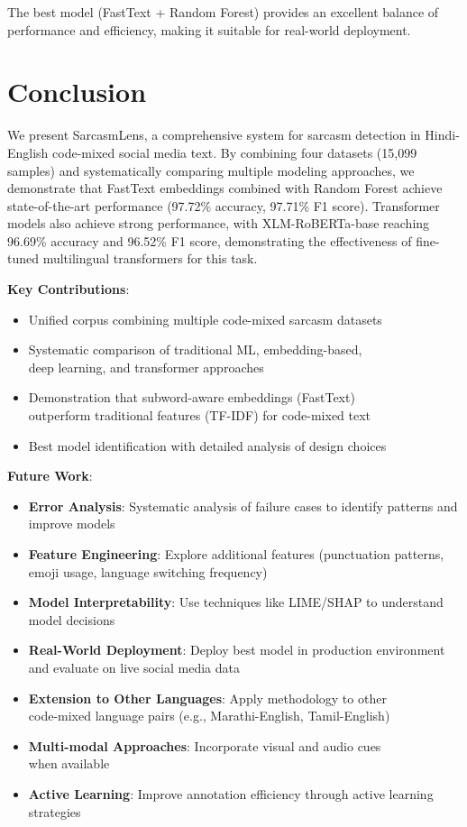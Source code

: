\documentclass[11pt]{article}
\begin{document}
The best model (FastText + Random Forest) provides an excellent balance of performance and efficiency, making it suitable for real-world deployment.

\section{Conclusion}

We present SarcasmLens, a comprehensive system for sarcasm detection in Hindi-English code-mixed social media text. By combining four datasets (15,099 samples) and systematically comparing multiple modeling approaches, we demonstrate that FastText embeddings combined with Random Forest achieve state-of-the-art performance (97.72\% accuracy, 97.71\% F1 score). Transformer models also achieve strong performance, with XLM-RoBERTa-base reaching 96.69\% accuracy and 96.52\% F1 score, demonstrating the effectiveness of fine-tuned multilingual transformers for this task.

\textbf{Key Contributions}:
\begin{itemize}
\item Unified corpus combining multiple code-mixed sarcasm datasets
\item Systematic comparison of traditional ML, embedding-based,\\ deep learning, and transformer approaches
\item Demonstration that subword-aware embeddings (FastText)\\ outperform traditional features (TF-IDF) for code-mixed text
\item Best model identification with detailed analysis of design choices
\end{itemize}

\textbf{Future Work}:
\begin{itemize}
\item \textbf{Error Analysis}: Systematic analysis of failure cases to identify patterns and improve models
\item \textbf{Feature Engineering}: Explore additional features (punctuation patterns, emoji usage, language switching frequency)
\item \textbf{Model Interpretability}: Use techniques like LIME/SHAP to understand model decisions
\item \textbf{Real-World Deployment}: Deploy best model in production environment\\ and evaluate on live social media data
\item \textbf{Extension to Other Languages}: Apply methodology to other\\ code-mixed language pairs (e.g., Marathi-English, Tamil-English)
\item \textbf{Multi-modal Approaches}: Incorporate visual and audio cues\\ when available
\item \textbf{Active Learning}: Improve annotation efficiency through active learning strategies
\end{itemize}
\end{document}
